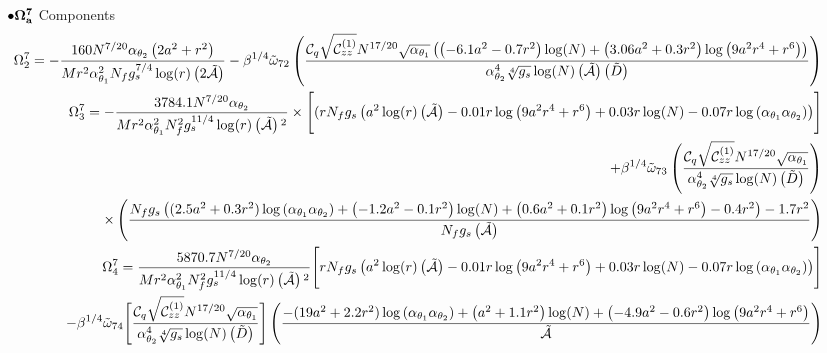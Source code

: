 \documentclass[a4paper,11pt,fleqn]{article}
\theoremstyle{plain}
\theoremstyle{definition}
\begin{document}
\noindent$\bullet{\bf\Omega^7_a}$ Components
{\scriptsize
\begin{eqnarray}
\label{Omega7a}
& & \hskip -0.5in\Omega^7_2=-\frac{160 N^{7/20} \alpha _{\theta_2} \left(2 a^2+r^2\right)}{M r^2 \alpha _{\theta_1}^2 N_f g_s^{7/4} \log (r) \left(2\tilde{\cal A}\right)} -\beta^{1/4}\tilde{\omega}_{72}\left(\frac{{\cal C}_q \sqrt{{\cal C}_{zz}^{(1)}} N^{17/20} \sqrt{\alpha _{\theta_1}} \left(\left(-{6.1} a^2-{0.7} r^2\right) \log (N)+\left({3.06} a^2+{0.3} r^2\right) \log \left(9 a^2 r^4+r^6\right)\right)}{\alpha _{\theta_2}^4 \sqrt[4]{g_s} \log (N) \left(\tilde{\cal A}\right) \left(\tilde{D}\right)}\right) \nonumber\\
   & &\hskip -0.5 in\Omega^7_3=-\frac{3784.1 N^{7/20} \alpha _{\theta_2}}{M r^2 \alpha _{\theta_1}^2 N_f^2 g_s^{11/4} \log (r) \left(\tilde{\cal A}\right){}^2}  \times  \Biggl[(r N_f g_s \left(a^2 \log (r) \left(\tilde{\cal A}\right) -0.01 r \log \left(9 a^2 r^4+r^6\right) +0.03 r \log
   (N)-0.07 r \log \left(\alpha _{\theta_1}\alpha _{\theta_2}\right)\right)\Biggr] \nonumber\\
   & & \hskip -0.5in +\beta^{1/4}\tilde{\omega}_{73}\left(\frac{{\cal C}_q \sqrt{{\cal C}_{zz}^{(1)}} N^{17/20} \sqrt{\alpha _{\theta_1}}}{\alpha _{\theta_2}^4 \sqrt[4]{g_s} \log (N) \left(\tilde{D}\right)}\right) \nonumber\\
 & & \hskip -0.5in  \times\left(\frac{N_f g_s \left(({2.5} a^2 + 0.3 r^2) \log \left(\alpha _{\theta_1}\alpha_{\theta_2}\right)+\left(-{1.2} a^2-{0.1} r^2\right) \log (N)+\left({0.6} a^2+{0.1} r^2\right) \log \left(9 a^2
   r^4+r^6\right)-{0.4}
   r^2\right)-{1.7} r^2}{N_f g_s \left(\tilde{\cal A}\right)}\right)\nonumber\\
   & & \hskip -0.5 in \Omega^7_4=\frac{5870.7 N^{7/20} \alpha _{\theta_2}}{M r^2 \alpha _{\theta_1}^2 N_f^2 g_s^{11/4} \log (r) \left(\tilde{\cal A}\right){}^2} \Biggl[r N_f g_s \left(a^2 \log (r) \left(\tilde{\cal A}\right)-0.01 r \log \left(9 a^2 r^4+r^6\right) +0.03 r \log
   (N)-0.07 r \log \left(\alpha _{\theta_1}\alpha_{\theta_2}\right)\right)\Biggr] \nonumber\\
   & & \hskip -0.5in -\beta^{1/4}\tilde{\omega}_{74}\Biggl[\frac{{\cal C}_q \sqrt{{\cal C}_{zz}^{(1)}} N^{17/20} \sqrt{\alpha _{\theta_1}}}{\alpha _{\theta_2}^4 \sqrt[4]{g_s} \log (N) \left(\tilde{D}\right)}\Biggr] \left(\frac{-({19} a^2 + 2.2 r^2) \log \left(\alpha _{\theta_1}\alpha_{\theta_2}\right)+\left( a^2+{1.1} r^2\right) \log (N)+\left(-{4.9} a^2-{0.6} r^2\right) \log \left(9 a^2 r^4+r^6\right)}{\tilde{\cal A}}\right) \nonumber
\end{eqnarray}
}
\end{document}

